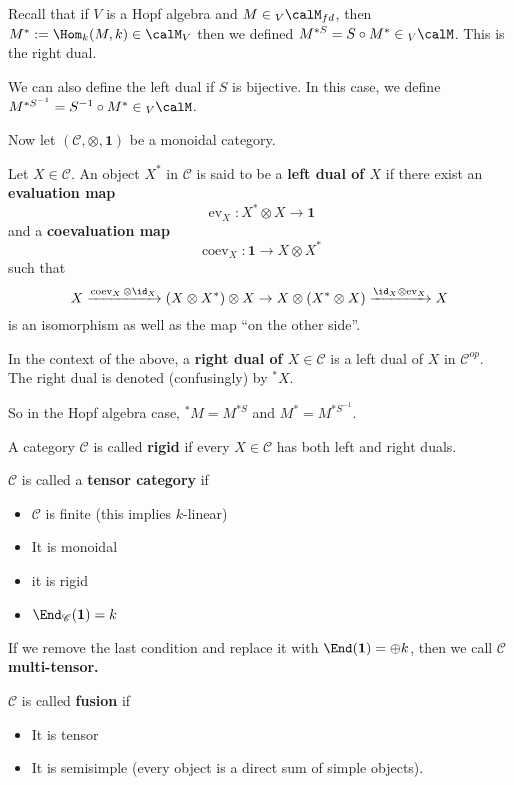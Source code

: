 \documentclass[12pt]{article}
\let\tilde\relax
\newcommand*{\tilde}[1]{\widetilde{#1}}
\begin{document}
Recall that if $V$ is a Hopf algebra and $M\in {_V\calM_{fd}}$, then $M^*:=\Hom_k(M,k)\in\calM_V$
then we defined $M^{*S}=\tilde S\circ M^*\in {_V\calM}$. This is the right dual.

We can also define the left dual if $S$ is bijective. In this case, we define $M^{*S^{-1}}=\tilde S^{-1}\circ M^*\in{_V\calM}$.

Now let $(\mathscr C,\otimes, \mathbf{1})$ be a monoidal category.
\begin{defn}
	Let $X\in\mathscr C$. An object $X^*$ in $\mathscr C$ is said to be a \textbf{left dual of $X$}
	if there exist an \textbf{evaluation map}
	\[\operatorname{ev}_X:X^*\otimes X\to \mathbf{1}\]
	and a \textbf{coevaluation map}
	\[\operatorname{coev}_X:\mathbf{1}\to X\otimes X^*\]
	such that
	\[X\xrightarrow{\operatorname{coev}_X\otimes\id_X}(X\otimes X^*)\otimes X\to X\otimes (X^*\otimes X)\xrightarrow{\id_X\otimes \operatorname{ev}_X} X\]
	is an isomorphism as well as the map ``on the other side''.
\end{defn}
\begin{defn}
	In the context of the above, a \textbf{right dual of $X\in\mathscr C$} is a left dual of $X$ in $\mathscr C^{op}$.
	The right dual is denoted (confusingly) by ${^*X}$.
\end{defn}
So in the Hopf algebra case, ${^*M}=M^{*S}$ and $M^*=M^{*S^{-1}}.$
\begin{defn}
	A category $\mathscr C$ is called \textbf{rigid} if every $X\in\mathscr C$ has both left and right duals.
\end{defn}
\begin{defn}
	$\mathscr C$ is called a \textbf{tensor category} if 
	\begin{itemize}
		\item $\mathscr C$ is finite (this implies $k$-linear)
		\item It is monoidal
		\item it is rigid
		\item $\End_\mathscr{C}(\mathbf{1})=k$
	\end{itemize}
\end{defn}
\begin{rmk}
	If we remove the last condition and replace it with $\End(\mathbf{1})=\oplus k$, then
	we call $\mathscr C$ \textbf{multi-tensor.}
\end{rmk}
\begin{defn}
	$\mathscr C$ is called \textbf{fusion} if 
	\begin{itemize}
		\item It is tensor
		\item It is semisimple (every object is a direct sum of simple objects).
	\end{itemize}
\end{defn}
\end{document}
